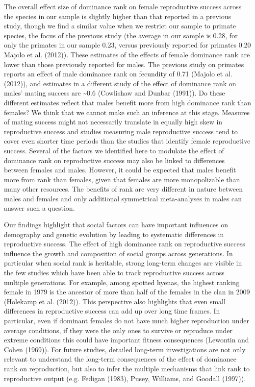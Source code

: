 \documentclass[
]{article}
\begin{document}
The overall effect size of dominance rank on female reproductive success
across the species in our sample is slightly higher than that reported
in a previous study, though we find a similar value when we restrict our
sample to primate species, the focus of the previous study (the average
in our sample is 0.28, for only the primates in our sample 0.23, versus
previously reported for primates 0.20 Majolo et al. (2012)). These
estimates of the effects of female dominance rank are lower than those
previously reported for males. The previous study on primates reports an
effect of male dominance rank on fecundity of 0.71 (Majolo et al.
(2012)), and estimates in a different study of the effect of dominance
rank on males' mating success are \textasciitilde0.6 (Cowlishaw and
Dunbar (1991)). Do these different estimates reflect that males benefit
more from high dominance rank than females? We think that we cannot make
such an inference at this stage. Measures of mating success might not
necessarily translate in equally high skew in reproductive success and
studies measuring male reproductive success tend to cover even shorter
time periods than the studies that identify female reproductive success.
Several of the factors we identified here to modulate the effect of
dominance rank on reproductive success may also be linked to differences
between females and males. However, it could be expected that males
benefit more from rank than females, given that females are more
monopolizable than many other resources. The benefits of rank are very
different in nature between males and females and only additional
symmetrical meta-analyses in males can answer such a question.

Our findings highlight that social factors can have important influences
on demography and genetic evolution by leading to systematic differences
in reproductive success. The effect of high dominance rank on
reproductive success influence the growth and composition of social
groups across generations. In particular when social rank is heritable,
strong long-term changes are visible in the few studies which have been
able to track reproductive success across multiple generations. For
example, among spotted hyenas, the highest ranking female in 1979 is the
ancestor of more than half of the females in the clan in 2009 (Holekamp
et al. (2012)). This perspective also highlights that even small
differences in reproductive success can add up over long time frames. In
particular, even if dominant females do not have much higher
reproduction under average conditions, if they were the only ones to
survive or reproduce under extreme conditions this could have important
fitness consequences (Lewontin and Cohen (1969)). For future studies,
detailed long-term investigations are not only relevant to understand
the long-term consequences of the effect of dominance rank on
reproduction, but also to infer the multiple mechanisms that link rank
to reproductive output (e.g. Fedigan (1983), Pusey, Williams, and
Goodall (1997)).
\end{document}

